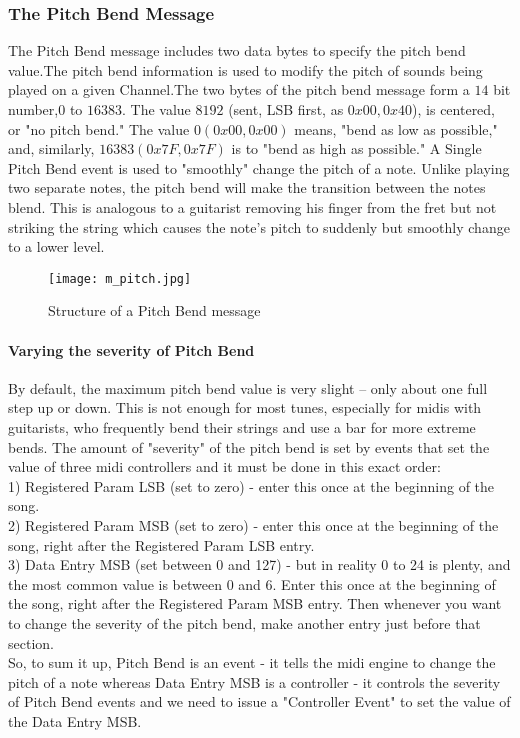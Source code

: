 \documentclass[12pt,a4paper]{article}
\begin{document}
\subsubsection{The Pitch Bend Message}
The Pitch Bend message includes two data bytes to specify the pitch bend value.The pitch bend information is used to modify the pitch of sounds being played on a given Channel.The two bytes of the pitch bend message form a $14$ bit number,$0$ to $16383$. The value $8192$ (sent, LSB first, as $0x00, 0x40$), is centered, or "no pitch bend." The value $0 (0x00, 0x00)$ means, "bend as low as possible," and, similarly, $16383 (0x7F, 0x7F)$ is to "bend as high as possible." A Single Pitch Bend event is used to "smoothly" change the pitch of a note.  Unlike playing two separate notes, the pitch bend will make the transition between the notes blend.  This is analogous to a guitarist removing his finger from the fret but not striking the string which causes the note's pitch to suddenly but smoothly change to a lower level.
\begin{figure}[!htb]
\centering
\texttt{[image: m\_pitch.jpg]}
\caption{Structure of a Pitch Bend message}
\label{BEND}
\end{figure}

\paragraph{Varying the severity of Pitch Bend}
By default, the maximum pitch bend value is very slight – only about one full step up or down.  This is not enough for most tunes, especially for midis with guitarists, who frequently bend their strings and use a bar for more extreme bends.  The amount of "severity" of the pitch bend is set by events that set the value of three midi controllers and it must be done in this exact order:\\
1)  Registered Param LSB  (set to zero) - enter this once at the beginning of the song.\\
2)  Registered Param MSB  (set to zero) - enter this once at the beginning of the song, right after the Registered Param LSB entry.\\
3)  Data Entry MSB (set between 0 and 127)  - but in reality 0 to 24 is plenty, and the most common value is between 0 and 6.  Enter this once at the beginning of the song, right after the Registered Param MSB entry.  Then whenever you want to change the severity of the pitch bend, make another entry just before that section.\\
So, to sum it up, Pitch Bend is an event - it tells the midi engine to change the pitch of a note whereas Data Entry MSB is a controller - it controls the severity of Pitch Bend events and we need  to issue a "Controller Event" to set the value of the Data Entry MSB.
\end{document}
